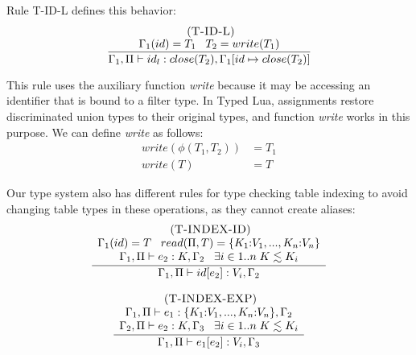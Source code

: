 \documentclass[preprint]{sigplanconf}
\newcommand{\mylabel}[1]{\; (\textsc{#1})}
\newcommand{\env}{\Gamma}
\newcommand{\penv}{\Pi}
\begin{document}
Rule \textsc{T-ID-L} defines this behavior:
\[
\begin{array}{c}
\mylabel{T-ID-L}\\
\dfrac{\env_{1}(id) = T_{1} \;\;\; T_{2} = write(T_{1})}
      {\env_{1}, \penv \vdash id_{l}:close(T_{2}), \env_{1}[id \mapsto close(T_{2})]}
\end{array}
\]

This rule uses the auxiliary function \emph{write} because it may be
accessing an identifier that is bound to a filter type.
In Typed Lua, assignments restore discriminated union types to their original types,
and function \emph{write} works in this purpose.
We can define \emph{write} as follows:
\begin{align*}
write(\phi(T_{1},T_{2})) & = T_{1}\\
write(T) & = T
\end{align*}

Our type system also has different rules for type checking table indexing to avoid
changing table types in these operations, as they cannot create aliases:
\[
\begin{array}{c}
\begin{array}{c}
\mylabel{T-INDEX-ID}\\
\dfrac{\begin{array}{c}
       \env_{1}(id) = T \;\;\;
       read(\penv, T) = \{K_{1}{:}V_{1}, ..., K_{n}{:}V_{n}\}\\
       \env_{1}, \penv \vdash e_{2}:K, \env_{2} \;\;\;
       \exists i \in 1{..}n \; K \lesssim K_{i}
       \end{array}}
      {\env_{1}, \penv \vdash id[e_{2}]:V_{i}, \env_{2}}
\end{array}
\\ \\
\begin{array}{c}
\mylabel{T-INDEX-EXP}\\
\dfrac{\begin{array}{c}
       \env_{1}, \penv \vdash e_{1}:\{K_{1}{:}V_{1}, ..., K_{n}{:}V_{n}\}, \env_{2}\\
       \env_{2}, \penv \vdash e_{2}:K, \env_{3} \;\;\;
       \exists i \in 1{..}n \; K \lesssim K_{i}
       \end{array}}
      {\env_{1}, \penv \vdash e_{1}[e_{2}]:V_{i}, \env_{3}}
\end{array}
\end{array}
\]
\end{document}

